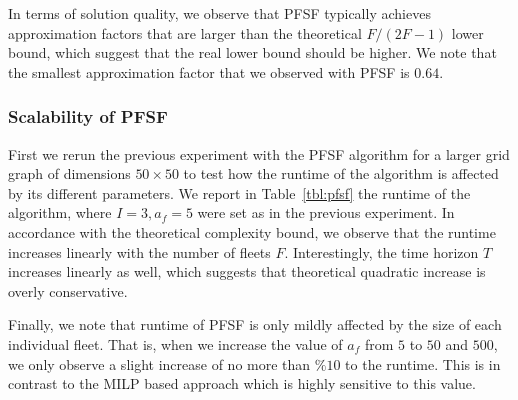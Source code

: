 \documentclass[conference]{IEEEtran}
\begin{document}
In terms of solution quality, we observe that PFSF typically achieves approximation factors that are larger than the theoretical $F/(2F-1)$ lower bound, which suggest that the real lower bound should be higher. We note that the smallest approximation factor that we observed with PFSF is $0.64$.

\subsubsection{Scalability of PFSF} 
First we rerun the previous experiment with the PFSF algorithm for a larger grid graph of dimensions $50\times 50$ to test how the runtime of the algorithm is affected by its different parameters. We report in Table~\ref{tbl:pfsf} the runtime of the algorithm, where $I=3, a_f=5$ were set as in the previous experiment. In accordance with the theoretical complexity bound, we observe that the runtime increases linearly with the number of fleets $F$. Interestingly, the time horizon $T$ increases linearly as well, which suggests that theoretical quadratic increase is overly conservative. 

Finally, we note that runtime of PFSF is only mildly affected by the size of each individual fleet. That is, when we increase the value of $a_f$ from $5$ to $50$ and $500$, we only observe a slight increase of no more than $\%10$ to the runtime. This is in contrast to the MILP based approach which is highly sensitive to this value. 

\end{document}
